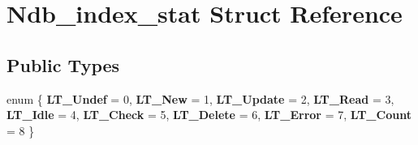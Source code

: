\hypertarget{structNdb__index__stat}{}\section{Ndb\+\_\+index\+\_\+stat Struct Reference}
\label{structNdb__index__stat}
\subsection*{Public Types}
\begin{DoxyCompactItemize}
\item 
\mbox{\label{structNdb__index__stat_aa55c4f78a1f0df9a43308437527aa2c7}} 
enum \{ \newline
{\bfseries L\+T\+\_\+\+Undef} = 0, 
{\bfseries L\+T\+\_\+\+New} = 1, 
{\bfseries L\+T\+\_\+\+Update} = 2, 
{\bfseries L\+T\+\_\+\+Read} = 3, 
\newline
{\bfseries L\+T\+\_\+\+Idle} = 4, 
{\bfseries L\+T\+\_\+\+Check} = 5, 
{\bfseries L\+T\+\_\+\+Delete} = 6, 
{\bfseries L\+T\+\_\+\+Error} = 7, 
\newline
{\bfseries L\+T\+\_\+\+Count} = 8
 \}
\end{DoxyCompactItemize}
